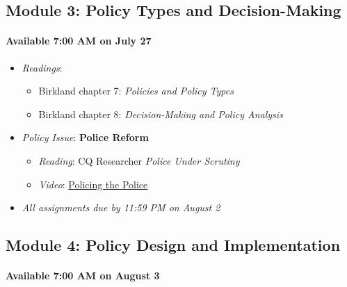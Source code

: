 \hypertarget{module-3-policy-types-and-decision-making}{%
\subsection{Module 3: Policy Types and
Decision-Making}\label{module-3-policy-types-and-decision-making}}

\hypertarget{available-700-am-on-july-27}{%
\paragraph{Available 7:00 AM on July
27}\label{available-700-am-on-july-27}}

\begin{itemize}

\item
  \emph{Readings}:

  \begin{itemize}
  
  \item
    Birkland chapter 7: \emph{Policies and Policy Types}
  \item
    Birkland chapter 8: \emph{Decision-Making and Policy Analysis}
  \end{itemize}
\item
  \emph{Policy Issue}: \textbf{Police Reform}

  \begin{itemize}
  
  \item
    \emph{Reading}: CQ Researcher \emph{Police Under Scrutiny}
  \item
    \emph{Video}:
    \href{https://www.pbs.org/video/policing-the-police-2020-ko2tft/}{Policing
    the Police}
  \end{itemize}
\item
  \emph{All assignments due by 11:59 PM on August 2}
\end{itemize}

\hypertarget{module-4-policy-design-and-implementation}{%
\subsection{Module 4: Policy Design and
Implementation}\label{module-4-policy-design-and-implementation}}

\hypertarget{available-700-am-on-august-3}{%
\paragraph{Available 7:00 AM on August
3}\label{available-700-am-on-august-3}}

